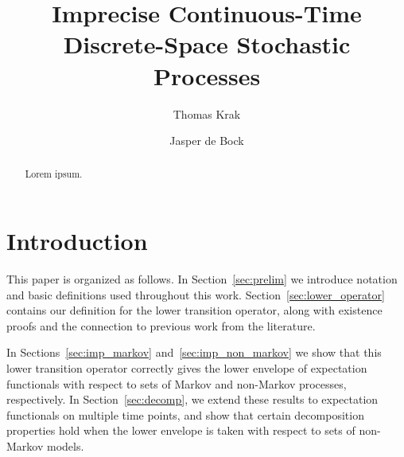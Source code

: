 \documentclass[10pt]{paper}
\title{Imprecise Continuous-Time Discrete-Space Stochastic Processes}
\author{Thomas Krak \and Jasper de Bock}
\theoremstyle{definition}
\begin{document}


\date{}
\maketitle

\begin{abstract}
Lorem ipsum.
\end{abstract}

\section{Introduction}\label{sec:introduction}

This paper is organized as follows. In Section~\ref{sec:prelim} we introduce notation and basic definitions used throughout this work. Section~\ref{sec:lower_operator} contains our definition for the lower transition operator, along with existence proofs and the connection to previous work from the literature. 

In Sections~\ref{sec:imp_markov} and~\ref{sec:imp_non_markov} we show that this lower transition operator correctly gives the lower envelope of expectation functionals with respect to sets of Markov and non-Markov processes, respectively. In Section~\ref{sec:decomp}, we extend these results to expectation functionals on multiple time points, and show that certain decomposition properties hold when the lower envelope is taken with respect to sets of non-Markov models. 
\end{document}
